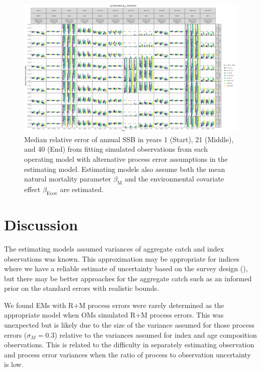 \documentclass[
  12pt,
]{article}
\begin{document}
\begin{landscape}
\begin{figure}
\caption{Median relative error of annual SSB in years 1 (Start), 21 (Middle), and 40 (End) from fitting simulated observations from each operating model with alternative process error assumptions in the estimating model. Estimating models also assume both the mean natural mortality parameter $\beta_\text{M}$ and the environmental covariate effect $\beta_\text{Ecov}$ are estimated.}\label{SSB_bias_M_estimated_beta_estimated}
\begin{center}
\includegraphics[height = \textheight]{SSB_bias_all_PE_effect_M_estimated_beta_estimated.png}
\end{center}
\end{figure}
\end{landscape}

\hypertarget{discussion}{%
\section*{Discussion}\label{discussion}}

The estimating models assumed variances of aggregate catch and index
observations was known. This approximation may be appropriate for
indices where we have a reliable estimate of uncertainty based on the
survey design (), but there may be better approaches for the aggregate
catch such as an informed prior on the standard errors with realistic
bounds.

We found EMs with R+M process errors were rarely determined as the
appropriate model when OMs simulated R+M process errors. This was
unexpected but is likely due to the size of the variance assumed for
those process errors (\(\sigma_M = 0.3\)) relative to the variances
assumed for index and age composition observations. This is related to
the difficulty in separately estimating observation and process error
variances when the ratio of process to observation uncertainty is low.
\end{document}
